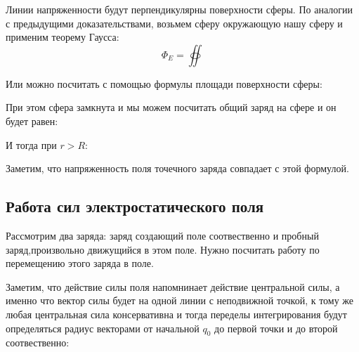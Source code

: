 \documentclass[../main.tex]{subfiles}
\begin{document}
Линии напряженности будут перпендикулярны поверхности сферы.
По аналогии с предыдущими доказательствами, возьмем сферу окружающую нашу сферу и применим теорему Гаусса:
\[\Phi_E = \oiint\]


Или можно посчитать с помощью формулы площади поверхности сферы:


При этом сфера замкнута и мы можем посчитать общий заряд на сфере и он будет равен:

И тогда при $r > R$:

Заметим, что напряженность поля точечного заряда совпадает с этой формулой.

\subsection{Работа сил электростатического поля}

Рассмотрим два заряда: заряд создающий поле соотвественно и пробный заряд,произвольно движущийся в этом поле. Нужно посчитать работу по перемещению этого заряда в поле.

Заметим, что действие силы поля напомнинает действие центральной силы, а именно что вектор силы будет на одной линии с неподвижной точкой, к тому же любая центральная сила консервативна и тогда переделы интегрирования будут определяться радиус векторами от начальной $q_0$ до первой точки и до второй соотвественно:
\end{document}
